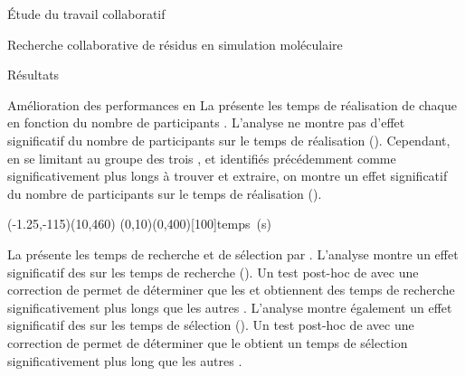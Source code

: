 \documentclass[myfrancais]{mythesis}
\begin{document}
\begin{mypart}{Étude du travail collaboratif}
\begin{mychapter}{Recherche collaborative de résidus en simulation moléculaire}
\begin{mysection}{Résultats}
\begin{mysubsection}{Amélioration des performances en }
					La  présente les temps de réalisation  de chaque   en fonction du nombre de participants .
					L'analyse ne montre pas d'effet significatif du nombre de participants  sur le temps de réalisation  ().
					Cependant, en se limitant au groupe des trois  ,  et  identifiés précédemment comme significativement plus longs à trouver et extraire, on montre un effet significatif du nombre de participants  sur le temps de réalisation  ().

					\begin{myfigure}
						\begin{myps}(-1.25,-115)(10,460)
							\myaxes(0,10){}(0,400)[100]{temps~(s)}
						\end{myps}
					\end{myfigure}

					La  présente les temps de recherche et de sélection par  .
					L'analyse montre un effet significatif des   sur les temps de recherche ().
					Un test post-hoc de  avec une correction de  permet de déterminer que les   et  obtiennent des temps de recherche significativement plus longs que les autres .
					L'analyse montre également un effet significatif des   sur les temps de sélection ().
					Un test post-hoc de  avec une correction de  permet de déterminer que le   obtient un temps de sélection significativement plus long que les autres .


\end{mysubsection}
\end{mysection}
\end{mychapter}
\end{mypart}
\end{document}
